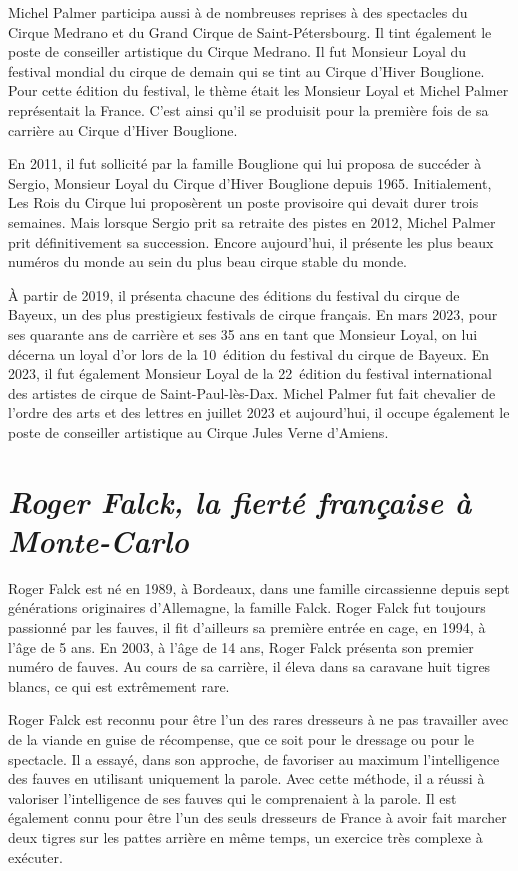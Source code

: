 Michel Palmer participa aussi à de nombreuses reprises à des spectacles du Cirque Medrano et du Grand Cirque de Saint-Pétersbourg. Il tint également le poste de conseiller artistique du Cirque Medrano. Il fut Monsieur Loyal du festival mondial du cirque de demain qui se tint au Cirque d’Hiver Bouglione. Pour cette édition du festival, le thème était les Monsieur Loyal et Michel Palmer représentait la France. C’est ainsi qu’il se produisit pour la première fois de sa carrière au Cirque d’Hiver Bouglione.

En 2011, il fut sollicité par la famille Bouglione qui lui proposa de succéder à Sergio, Monsieur Loyal du Cirque d’Hiver Bouglione depuis 1965. Initialement, Les Rois du Cirque lui proposèrent un poste provisoire qui devait durer trois semaines. Mais lorsque Sergio prit sa retraite des pistes en 2012, Michel Palmer prit définitivement sa succession. Encore aujourd’hui, il présente les plus beaux numéros du monde au sein du plus beau cirque stable du monde.

À partir de 2019, il présenta chacune des éditions du festival du cirque de Bayeux, un des plus prestigieux festivals de cirque français. En mars 2023, pour ses quarante ans de carrière et ses 35 ans en tant que Monsieur Loyal, on lui décerna un loyal d’or lors de la 10\ieme~édition du festival du cirque de Bayeux. En 2023, il fut également Monsieur Loyal de la 22\ieme~édition du festival international des artistes de cirque de Saint-Paul-lès-Dax. Michel Palmer fut fait chevalier de l’ordre des arts et des lettres en juillet 2023 et aujourd’hui, il occupe également le poste de conseiller artistique au Cirque Jules Verne d’Amiens. 

\section*{\textit{Roger Falck, la fierté française à Monte-Carlo }}
{}

Roger Falck est né en 1989, à Bordeaux, dans une famille circassienne depuis sept générations originaires d’Allemagne, la famille Falck. Roger Falck fut toujours passionné par les fauves, il fit d’ailleurs sa première entrée en cage, en 1994, à l’âge de 5 ans. En 2003, à l'âge de 14 ans, Roger Falck présenta son premier numéro de fauves. Au cours de sa carrière, il éleva dans sa caravane huit tigres blancs, ce qui est extrêmement rare. 

Roger Falck est reconnu pour être l'un des rares dresseurs à ne pas travailler avec de la viande en guise de récompense, que ce soit pour le dressage ou pour le spectacle. Il a essayé, dans son approche, de favoriser au maximum l’intelligence des fauves en utilisant uniquement la parole. Avec cette méthode, il a réussi à valoriser l’intelligence de ses fauves qui le comprenaient à la parole. Il est également connu pour être l’un des seuls dresseurs de France à avoir fait marcher deux tigres sur les pattes arrière en même temps, un exercice très complexe à exécuter.

